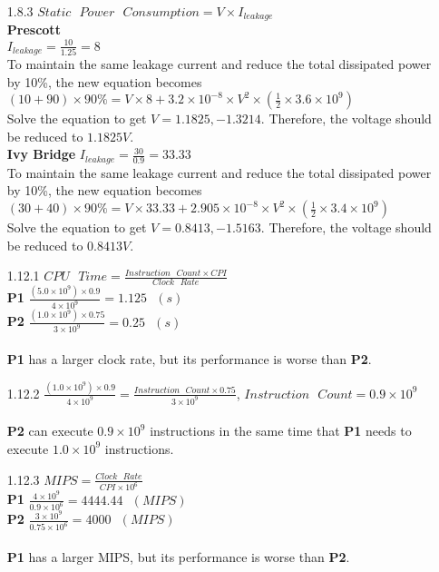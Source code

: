 \documentclass[12pt, a4paper]{article}
\begin{document}
\begin{itemize}[font=\bfseries]
\item[1.8.3]
$Static\mbox{ }Power\mbox{ }Consumption = V \times I_{leakage}$ \\
{\bf Prescott} \\
$I_{leakage} = \frac{10}{1.25} = 8$ \\
To maintain the same leakage current and reduce the total dissipated power by 10\%, the new equation becomes \\
$(10 + 90) \times 90\% = V \times 8 + 3.2 \times 10^{-8} \times V^2 \times (\frac{1}{2} \times 3.6 \times 10^9)$ \\
Solve the equation to get $V = 1.1825, -1.3214$. Therefore, the voltage should be reduced to $1.1825 V$.
\\
{\bf Ivy Bridge}
$I_{leakage} = \frac{30}{0.9} = 33.33$ \\
To maintain the same leakage current and reduce the total dissipated power by 10\%, the new equation becomes \\
$(30 + 40) \times 90\% = V \times 33.33 + 2.905 \times 10^{-8} \times V^2 \times (\frac{1}{2} \times 3.4 \times 10^9)$ \\
Solve the equation to get $V = 0.8413, -1.5163$. Therefore, the voltage should be reduced to $0.8413 V$.

\item[1.12.1]
$CPU\mbox{ }Time = \frac{Instruction\mbox{ }Count \times CPI}{Clock\mbox{ }Rate}$ \\
{\bf P1} \hspace{0.2cm} $\frac{(5.0 \times 10^9) \times 0.9}{4 \times 10^9} = 1.125\mbox{ }(s)$ \\
{\bf P2} \hspace{0.2cm} $\frac{(1.0 \times 10^9) \times 0.75}{3 \times 10^9} = 0.25\mbox{ }(s)$ \\
\\
{\bf P1} has a larger clock rate, but its performance is worse than {\bf P2}.

\item[1.12.2]
$\frac{(1.0 \times 10^9) \times 0.9}{4 \times 10^9} = \frac{Instruction\mbox{ }Count \times 0.75}{3 \times 10^9}$, $Instruction\mbox{ }Count = 0.9 \times 10^9$ \\
\\
{\bf P2} can execute  $0.9 \times 10^9$ instructions in the same time that {\bf P1} needs to execute $1.0 \times 10^9$ instructions.

\item[1.12.3]
$MIPS = \frac{Clock\mbox{ }Rate}{CPI \times 10^6}$ \\
{\bf P1} \hspace{0.2cm} $\frac{4 \times 10^9}{0.9 \times 10^6} = 4444.44\mbox{ }(MIPS)$ \\
{\bf P2} \hspace{0.2cm} $\frac{3 \times 10^9}{0.75 \times 10^6} = 4000\mbox{ }(MIPS)$ \\
\\
{\bf P1} has a larger MIPS, but its performance is worse than {\bf P2}.


\end{itemize}
\end{document}
